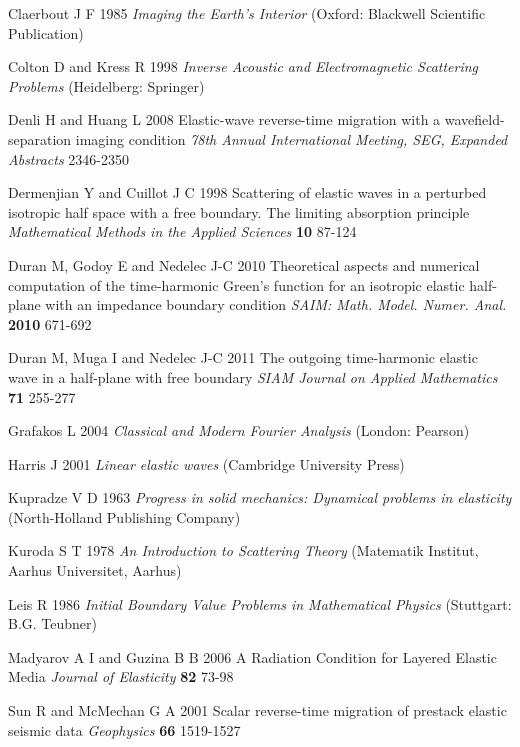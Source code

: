 \documentclass[12pt]{iopart}
\begin{document}
{\begin{thebibliography}{99}
	{Claerbout J F } 1985  { \em Imaging the Earth's Interior} (Oxford: Blackwell Scientific Publication)
	
	Colton D  and   Kress R 1998 {\em Inverse Acoustic and Electromagnetic Scattering Problems } (Heidelberg: Springer)
	
	Denli H and Huang L 2008
	{Elastic-wave reverse-time migration with a wavefield-separation imaging condition}
	{\it 78th Annual International Meeting, SEG, Expanded Abstracts} 2346-2350
	
	Dermenjian Y and Cuillot J C 1998
	{Scattering of elastic waves in a perturbed isotropic half space with a free boundary. The limiting absorption principle}
	{\it Mathematical Methods in the Applied Sciences} {\bf 10} 87-124
	
	Duran M, Godoy E and Nedelec J-C 2010
	Theoretical aspects and numerical computation of the time-harmonic Green's function
	for an isotropic elastic half-plane with an impedance boundary condition
	{\it SAIM: Math. Model. Numer. Anal.} {\bf 2010} 671-692
	
	Duran M, Muga I and Nedelec J-C 2011
	{The outgoing time-harmonic elastic wave in a half-plane with free boundary}
	{\it SIAM Journal on Applied Mathematics} {\bf 71} 255-277
	
	{Grafakos L} 2004 {\em Classical and Modern Fourier Analysis } (London: Pearson)
	
	Harris J 2001 {\em Linear elastic waves} {(Cambridge University Press)}
	
	Kupradze V D 1963 {\em Progress in solid mechanics: Dynamical problems in elasticity} {(North-Holland Publishing Company)}
	
	Kuroda S T 1978 {\em An Introduction to Scattering Theory} (Matematik Institut, Aarhus Universitet, Aarhus)
	
	{Leis R} 1986 {\em Initial Boundary Value Problems in Mathematical Physics} {(Stuttgart: B.G. Teubner)}
	
	Madyarov A I and Guzina B B 2006 {A Radiation Condition for Layered Elastic Media} {\it Journal of Elasticity} {\bf 82} 73-98
	
Sun R and McMechan G A 2001 Scalar reverse-time migration of prestack elastic seismic data {\it Geophysics} {\bf 66} 1519-1527


\end{thebibliography}}
\end{document}
